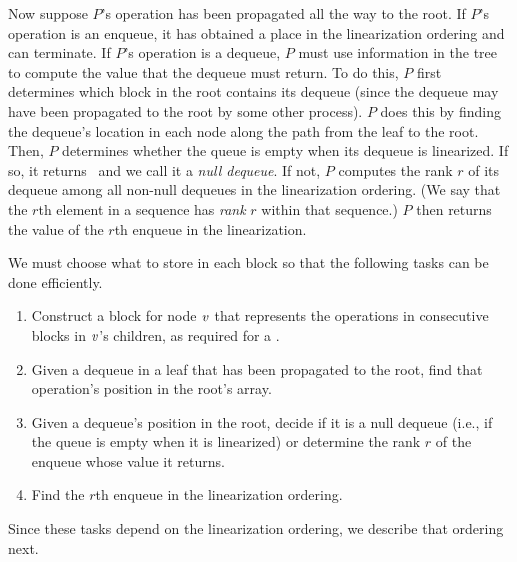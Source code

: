 Now suppose $P$'s operation has been propagated all the way to the root.
If $P$'s operation is an enqueue, it has obtained a place in the linearization ordering and can terminate.
If $P$'s operation is a dequeue, $P$ must use information in the tree to compute the value that the
dequeue must return.  To do this, $P$ first determines which block in the root contains its dequeue
(since the dequeue may have been propagated to the root by some other process).
$P$ does this by finding the dequeue's location in each node along the path from the leaf to the root.
Then, $P$ determines whether the queue is empty when its dequeue is linearized. 
If so, it returns \nl\ and we call it a \emph{null dequeue}.
If not, $P$ computes the rank $r$ of its dequeue among all non-null dequeues in the linearization ordering.  (We say that the $r$th element in a sequence has \emph{rank} $r$ within that sequence.)
$P$ then returns the value of the $r$th enqueue in the linearization.

We must choose what to store in each block so that the following tasks can be done efficiently.
\begin{enumerate}[label={(T\arabic*)}]
\item
\label{construct}
Construct a block for node $\mbox{\textnormal{\textit{v}}}$ that represents the operations in consecutive blocks in $\mbox{\textnormal{\textit{v}}}$'s children, as required for a .
\item
\label{findinroot}
Given a dequeue in a leaf that has been propagated to the root, find that operation's position in the root's  array.
\item
\label{findrank}
Given a dequeue's position in the root, decide if it is a null dequeue (i.e., if the queue is empty when it is linearized)
or determine the rank $r$ of the enqueue whose value it returns.
\item
\label{findenqueue}
Find the $r$th enqueue in the linearization ordering.
\end{enumerate}
Since these tasks depend on the linearization ordering, we describe that ordering next.

